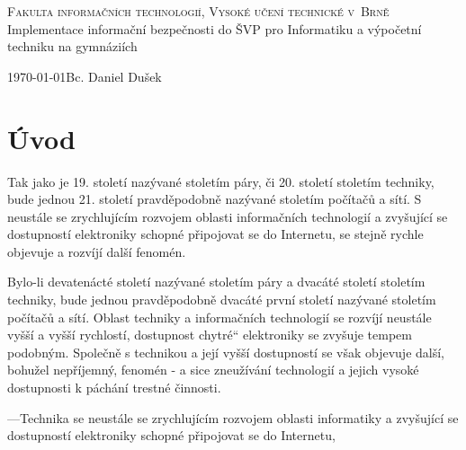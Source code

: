 \documentclass[a4paper, 11pt]{article}
\title{\thesisname}
\author{Bc. Daniel Dušek}
\providecommand{\uv}[1]{\quotedblbase #1\textquotedblleft}
\newcommand{\thesisname}{Implementace informační bezpečnosti do ŠVP pro Informatiku a výpočetní techniku na gymnáziích}
\begin{document}
\thispagestyle{empty}
\begin{center}
\Huge
\textsc{Fakulta informačních technologií, Vysoké učení technické v~Brně}\\
\LARGE
{}
\thesisname
{}
\end{center}
{\Large \today \hfill Bc. Daniel Dušek}





\newpage
\tableofcontents

\newpage
\setcounter{page}{1}
\section{Úvod}

Tak jako je 19. století nazývané stoletím páry, či 20. století stoletím techniky, bude jednou 21. století pravděpodobně nazývané stoletím počítačů a sítí. S neustále se zrychlujícím rozvojem oblasti informačních technologií a zvyšující se dostupností elektroniky schopné připojovat se do Internetu, se stejně rychle objevuje a rozvíjí další fenomén.  

Bylo-li devatenácté století nazývané stoletím páry a dvacáté století stoletím techniky, bude jednou pravděpodobně dvacáté první století nazývané stoletím počítačů a sítí. Oblast techniky a informačních technologií se rozvíjí neustále vyšší a vyšší rychlostí, dostupnost \uv{chytré} elektroniky se zvyšuje tempem podobným. Společně s technikou a její vyšší dostupností se však objevuje další, bohužel nepříjemný, fenomén \-- a sice zneužívání technologií a jejich vysoké dostupnosti k páchání trestné činnosti. %
% 



---Technika se neustále se zrychlujícím rozvojem oblasti informatiky a zvyšující se dostupností elektroniky schopné připojovat se do Internetu, 
\end{document}
